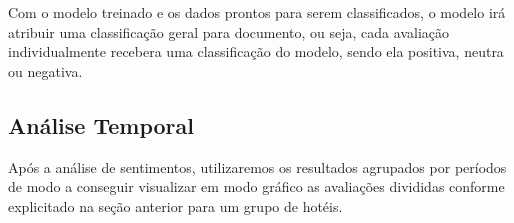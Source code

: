 Com o modelo treinado e os dados prontos para serem classificados, o modelo irá atribuir uma classificação geral para documento, ou seja, cada avaliação individualmente recebera uma classificação do modelo, sendo ela positiva, neutra ou negativa.

\subsection{Análise Temporal}
\label{subsec:analise_temporal}
Após a análise de sentimentos, utilizaremos os resultados agrupados por períodos de modo a conseguir visualizar em modo gráfico as avaliações divididas conforme explicitado na seção anterior para um grupo de hotéis.
